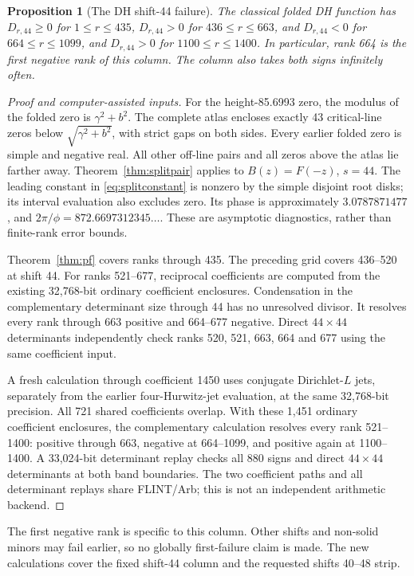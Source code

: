 \documentclass[11pt]{article}
\newtheorem{proposition}[theorem]{Proposition}
\theoremstyle{remark}
\begin{document}
\begin{proposition}[The DH shift-44 failure]\label{prop:shift44}
The classical folded DH function has
\(D_{r,44}\ge0\) for \(1\le r\le435\),
\(D_{r,44}>0\) for \(436\le r\le663\), and
\(D_{r,44}<0\) for \(664\le r\le1099\), and
\(D_{r,44}>0\) for \(1100\le r\le1400\).
In particular, rank 664 is the first negative rank of this column.
The column also takes both signs infinitely often.
\end{proposition}
\begin{proof}[Proof and computer-assisted inputs]
For the height-85.6993 zero, the modulus of the folded zero is
\(\gamma^2+b^2\). The complete atlas encloses exactly 43 critical-line
zeros below \(\sqrt{\gamma^2+b^2}\), with strict gaps on both sides.
Every earlier folded zero is simple and negative real. All other off-line
pairs and all zeros above the atlas lie farther away.
Theorem~\ref{thm:splitpair} applies to \(B(z)=F(-z)\), \(s=44\).
The leading constant in \eqref{eq:splitconstant} is nonzero by the simple
disjoint root disks; its interval evaluation also excludes zero.
Its phase is approximately \(3.0787871477\), and
\(2\pi/\phi=872.6697312345\ldots\).
These are asymptotic diagnostics, rather than finite-rank error bounds.

Theorem~\ref{thm:pf} covers ranks through 435. The preceding grid covers
436--520 at shift 44. For ranks 521--677, reciprocal coefficients are
computed from the existing 32,768-bit ordinary coefficient enclosures.
Condensation in the complementary determinant size through 44 has no
unresolved divisor. It resolves every rank through 663 positive and
664--677 negative. Direct \(44\times44\) determinants independently
check ranks 520, 521, 663, 664 and 677 using the same coefficient input.

A fresh calculation through coefficient 1450 uses conjugate Dirichlet-\(L\)
jets, separately from the earlier four-Hurwitz-jet evaluation, at the same
32,768-bit precision. All 721 shared coefficients overlap. With these
1,451 ordinary coefficient enclosures, the complementary calculation
resolves every rank 521--1400: positive through 663, negative at 664--1099,
and positive again at 1100--1400. A 33,024-bit determinant replay checks all
880 signs and direct \(44\times44\) determinants at both band boundaries.
The two coefficient paths and all determinant replays share FLINT/Arb;
this is not an independent arithmetic backend.
\end{proof}
The first negative rank is specific to this column. Other shifts and
non-solid minors may fail earlier, so no globally first-failure claim is
made. The new calculations cover the fixed shift-44 column and the
requested shifts 40--48 strip.
\end{document}
